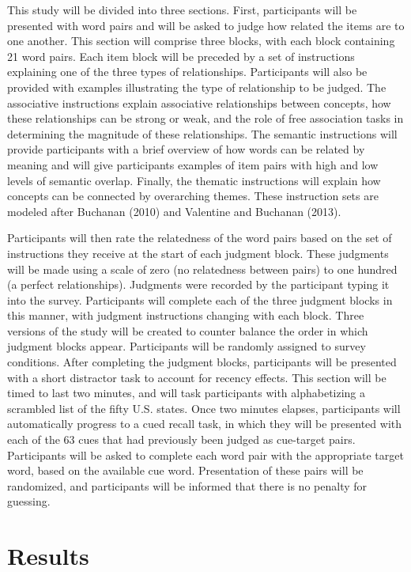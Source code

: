 \documentclass[english,man]{apa6}
\theoremstyle{definition}
\theoremstyle{definition}
\theoremstyle{remark}
\begin{document}
This study will be divided into three sections. First, participants will
be presented with word pairs and will be asked to judge how related the
items are to one another. This section will comprise three blocks, with
each block containing 21 word pairs. Each item block will be preceded by
a set of instructions explaining one of the three types of
relationships. Participants will also be provided with examples
illustrating the type of relationship to be judged. The associative
instructions explain associative relationships between concepts, how
these relationships can be strong or weak, and the role of free
association tasks in determining the magnitude of these relationships.
The semantic instructions will provide participants with a brief
overview of how words can be related by meaning and will give
participants examples of item pairs with high and low levels of semantic
overlap. Finally, the thematic instructions will explain how concepts
can be connected by overarching themes. These instruction sets are
modeled after Buchanan (2010) and Valentine and Buchanan (2013).

Participants will then rate the relatedness of the word pairs based on
the set of instructions they receive at the start of each judgment
block. These judgments will be made using a scale of zero (no
relatedness between pairs) to one hundred (a perfect relationships).
Judgments were recorded by the participant typing it into the survey.
Participants will complete each of the three judgment blocks in this
manner, with judgment instructions changing with each block. Three
versions of the study will be created to counter balance the order in
which judgment blocks appear. Participants will be randomly assigned to
survey conditions. After completing the judgment blocks, participants
will be presented with a short distractor task to account for recency
effects. This section will be timed to last two minutes, and will task
participants with alphabetizing a scrambled list of the fifty U.S.
states. Once two minutes elapses, participants will automatically
progress to a cued recall task, in which they will be presented with
each of the 63 cues that had previously been judged as cue-target pairs.
Participants will be asked to complete each word pair with the
appropriate target word, based on the available cue word. Presentation
of these pairs will be randomized, and participants will be informed
that there is no penalty for guessing.

\section{Results}\label{results}
\end{document}
